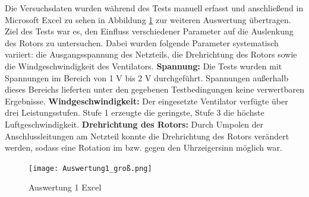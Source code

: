 \documentclass[a4paper,12pt]{article}
\begin{document}
Die Versuchsdaten wurden während des Tests manuell erfasst und anschließend in Microsoft Excel zu sehen in Abbildung \ref{fig:Auswertung 1 Excel} zur weiteren Auswertung übertragen. Ziel des Tests war es, den Einfluss verschiedener Parameter auf die Auslenkung des Rotors zu untersuchen.
Dabei wurden folgende Parameter systematisch variiert: die Ausgangsspannung des Netzteils, die Drehrichtung des Rotors sowie die Windgeschwindigkeit des Ventilators. \newline
\textbf{Spannung:} Die Tests wurden mit Spannungen im Bereich von 1 V bis 2 V durchgeführt. Spannungen außerhalb dieses Bereichs lieferten unter den gegebenen Testbedingungen keine verwertbaren Ergebnisse. \newline
\textbf{Windgeschwindigkeit:} Der eingesetzte Ventilator verfügte über drei Leistungsstufen. Stufe 1 erzeugte die geringste, Stufe 3 die höchste Luftgeschwindigkeit. \newline
\textbf{Drehrichtung des Rotors:} Durch Umpolen der Anschlussleitungen am Netzteil konnte die Drehrichtung des Rotors verändert werden, sodass eine Rotation im bzw. gegen den Uhrzeigersinn möglich war.

\begin{figure}[H]
    \centering
    \texttt{[image: Auswertung1\_groß.png]}
    \caption{Auswertung 1 Excel}
    \label{fig:Auswertung 1 Excel}
\end{figure}
\end{document}
